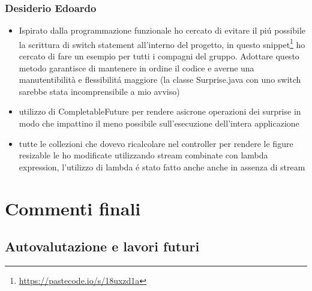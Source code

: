 \documentclass[a4paper,12pt]{report}
\begin{document}
\subsection{Desiderio Edoardo}
\begin{itemize}
    \item Ispirato dalla programmazione funzionale ho cercato di evitare il piú possibile la scrittura di switch
          statement all'interno del progetto, in questo snippet\footnote{\url{https://pastecode.io/s/18uxzd1a}} ho cercato
          di fare un esempio per tutti i compagni del gruppo. Adottare questo metodo garantisce di mantenere in ordine il codice
          e averne una manutentibilità e flessibilitá maggiore (la classe Surprise.java con uno switch sarebbe stata incomprensibile a mio avviso)
    \item utilizzo di CompletableFuture per rendere asicrone operazioni dei surprise in modo che impattino il meno possibile
          sull'esecuzione dell'intera applicazione
    \item tutte le collezioni che dovevo ricalcolare nel controller per rendere le figure resizable le ho modificate
          utilizzando stream combinate con lambda expression, l'utilizzo di lambda é stato fatto anche anche in assenza di stream
\end{itemize}


\chapter{Commenti finali}
\section{Autovalutazione e lavori futuri}

\appendix
\end{document}
